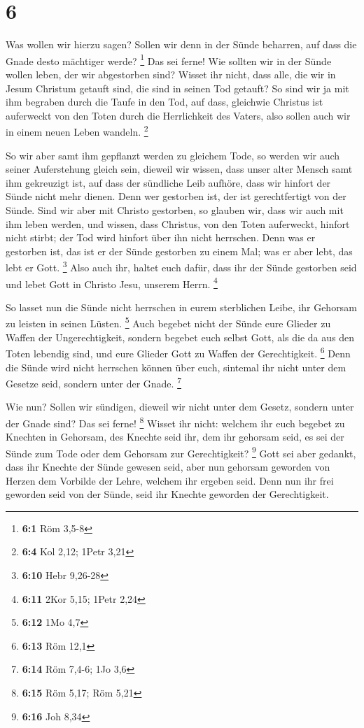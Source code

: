 \hypertarget{section-2}{%
\section{6}\label{section-2}}

 Was wollen wir hierzu sagen? Sollen wir denn in der Sünde
beharren, auf dass die Gnade desto mächtiger werde? \footnote{\textbf{6:1}
  Röm 3,5-8}  Das sei ferne! Wie sollten wir in der Sünde
wollen leben, der wir abgestorben sind?  Wisset ihr nicht,
dass alle, die wir in Jesum Christum getauft sind, die sind in seinen
Tod getauft?  So sind wir ja mit ihm begraben durch die
Taufe in den Tod, auf dass, gleichwie Christus ist auferweckt von den
Toten durch die Herrlichkeit des Vaters, also sollen auch wir in einem
neuen Leben wandeln. \footnote{\textbf{6:4} Kol 2,12; 1Petr 3,21}

 So wir aber samt ihm gepflanzt werden zu gleichem Tode,
so werden wir auch seiner Auferstehung gleich sein, 
dieweil wir wissen, dass unser alter Mensch samt ihm gekreuzigt ist, auf
dass der sündliche Leib aufhöre, dass wir hinfort der Sünde nicht mehr
dienen.  Denn wer gestorben ist, der ist gerechtfertigt
von der Sünde.  Sind wir aber mit Christo gestorben, so
glauben wir, dass wir auch mit ihm leben werden,  und
wissen, dass Christus, von den Toten auferweckt, hinfort nicht stirbt;
der Tod wird hinfort über ihn nicht herrschen.  Denn was
er gestorben ist, das ist er der Sünde gestorben zu einem Mal; was er
aber lebt, das lebt er Gott. \footnote{\textbf{6:10} Hebr 9,26-28}
 Also auch ihr, haltet euch dafür, dass ihr der Sünde
gestorben seid und lebet Gott in Christo Jesu, unserem Herrn.
\footnote{\textbf{6:11} 2Kor 5,15; 1Petr 2,24}

 So lasset nun die Sünde nicht herrschen in eurem
sterblichen Leibe, ihr Gehorsam zu leisten in seinen Lüsten. \footnote{\textbf{6:12}
  1Mo 4,7}  Auch begebet nicht der Sünde eure Glieder zu
Waffen der Ungerechtigkeit, sondern begebet euch selbst Gott, als die da
aus den Toten lebendig sind, und eure Glieder Gott zu Waffen der
Gerechtigkeit. \footnote{\textbf{6:13} Röm 12,1}  Denn
die Sünde wird nicht herrschen können über euch, sintemal ihr nicht
unter dem Gesetze seid, sondern unter der Gnade. \footnote{\textbf{6:14}
  Röm 7,4-6; 1Jo 3,6}

 Wie nun? Sollen wir sündigen, dieweil wir nicht unter
dem Gesetz, sondern unter der Gnade sind? Das sei ferne! \footnote{\textbf{6:15}
  Röm 5,17; Röm 5,21}  Wisset ihr nicht: welchem ihr euch
begebet zu Knechten in Gehorsam, des Knechte seid ihr, dem ihr gehorsam
seid, es sei der Sünde zum Tode oder dem Gehorsam zur Gerechtigkeit?
\footnote{\textbf{6:16} Joh 8,34}  Gott sei aber gedankt,
dass ihr Knechte der Sünde gewesen seid, aber nun gehorsam geworden von
Herzen dem Vorbilde der Lehre, welchem ihr ergeben seid. 
Denn nun ihr frei geworden seid von der Sünde, seid ihr Knechte geworden
der Gerechtigkeit.

